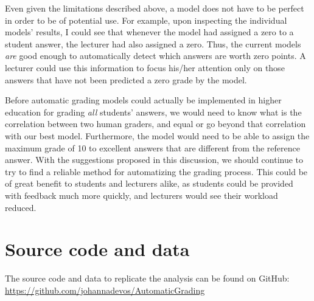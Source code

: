 \documentclass[a4paper,10pt,twoside]{article}
\begin{document}
Even given the limitations described above, a model does not have to be perfect in order to be of potential use. For example, upon inspecting the individual models' results, I could see that whenever the model had assigned a zero to a student answer, the lecturer had also assigned a zero. Thus, the current models \textit{are} good enough to automatically detect which answers are worth zero points. A lecturer could use this information to focus his/her attention only on those answers that have not been predicted a zero grade by the model.

Before automatic grading models could actually be implemented in higher education for grading \textit{all} students' answers, we would need to know what is the correlation between two human graders, and equal or go beyond that correlation with our best model. Furthermore, the model would need to be able to assign the maximum grade of 10 to excellent answers that are different from the reference answer. With the suggestions proposed in this discussion, we should continue to try to find a reliable method for automatizing the grading process. This could be of great benefit to students and lecturers alike, as students could be provided with feedback much more quickly, and lecturers would see their workload reduced.

\section*{Source code and data}
The source code and data to replicate the analysis can be found on GitHub: \url{https://github.com/johannadevos/AutomaticGrading}

 
 

\newpage
\end{document}

